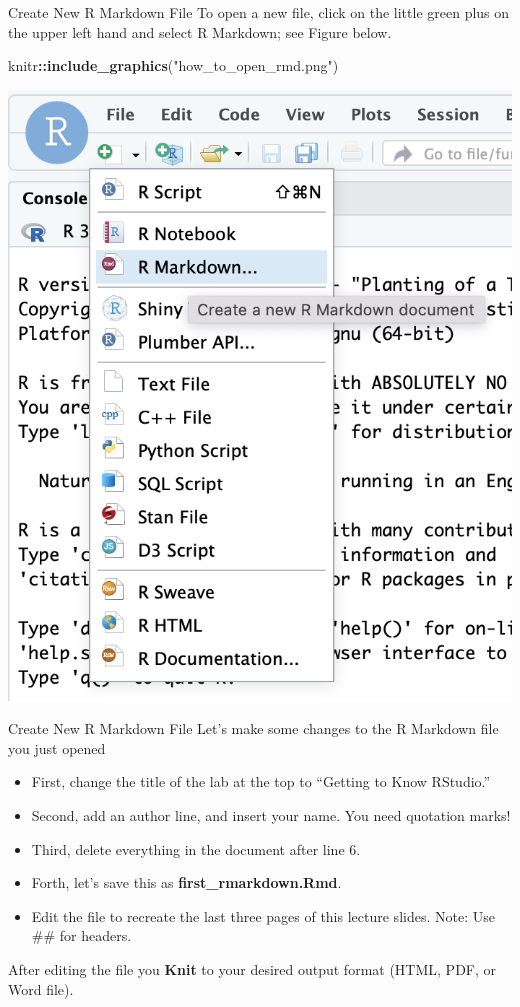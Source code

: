 \documentclass[
  ignorenonframetext,
]{beamer}
\newenvironment{Shaded}{\begin{snugshade}}{\end{snugshade}}
\newcommand{\FunctionTok}[1]{\textcolor[rgb]{0.13,0.29,0.53}{\textbf{#1}}}
\newcommand{\NormalTok}[1]{#1}
\newcommand{\SpecialCharTok}[1]{\textcolor[rgb]{0.81,0.36,0.00}{\textbf{#1}}}
\newcommand{\StringTok}[1]{\textcolor[rgb]{0.31,0.60,0.02}{#1}}
\providecommand{\tightlist}{%
  \setlength{\itemsep}{0pt}\setlength{\parskip}{0pt}}
\begin{document}
\begin{frame}[fragile]{Create New R Markdown File}
\protect\hypertarget{create-new-r-markdown-file}{}
To open a new file, click on the little green plus on the upper left
hand and select R Markdown; see Figure below.

\small

\begin{Shaded}
\begin{Highlighting}[]
\NormalTok{knitr}\SpecialCharTok{::}\FunctionTok{include\_graphics}\NormalTok{(}\StringTok{"how\_to\_open\_rmd.png"}\NormalTok{)}
\end{Highlighting}
\end{Shaded}

\begin{center}\includegraphics[width=0.5\linewidth,height=0.5\textheight]{how_to_open_rmd} \end{center}
\normalsize
\end{frame}

\begin{frame}{Create New R Markdown File}
\protect\hypertarget{create-new-r-markdown-file-1}{}
Let's make some changes to the R Markdown file you just opened

\begin{itemize}
\tightlist
\item
  First, change the title of the lab at the top to ``Getting to Know
  RStudio.''
\item
  Second, add an author line, and insert your name. You need quotation
  marks!
\item
  Third, delete everything in the document after line 6.
\item
  Forth, let's save this as \textbf{first\_rmarkdown.Rmd}.
\item
  Edit the file to recreate the last three pages of this lecture slides.
  Note: Use \#\# for headers.
\end{itemize}

After editing the file you \textbf{Knit} to your desired output format
(HTML, PDF, or Word file).
\end{frame}
\end{document}
